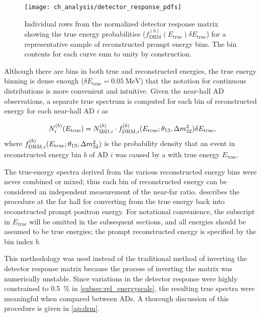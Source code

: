 \begin{figure}
    \centering
    \texttt{[image: ch\_analysis/detector\_response\_pdfs]}
    \caption[Individual rows of normalized detector response matrix]{
        Individual rows from the normalized detector response matrix
        showing the true \nuebar{} energy probabilities
        ($f^{(b)}_\text{DRM}(E_\text{true})\delta E_\text{true}$)
        for a representative sample of reconstructed prompt energy bins.
        The bin contents for each curve sum to unity by construction.
    }
    \label{fig:drm_pdfs}
\end{figure}

Although there are bins in both true and reconstructed energies,
the true energy binning is dense enough ($\delta E_{\text{true}} = \SI{0.05}{\MeV}$)
that the notation for continuous distributions is more convenient and intuitive.
Given the near-hall AD observations,
a separate true \nuebar{} spectrum is computed
for each bin of reconstructed energy for each near-hall AD $i$ as

\begin{equation}\label{eq:drm}
    N_i^{(b)}(E_{\text{true}}) = N_{\text{IBD},i}^{(b)}
    \cdot f_{\text{DRM},i}^{(b)}(E_{\text{true}}; \theta_{13}, \Delta m^2_{32}) \delta E_{\text{true}},
\end{equation}
where $f_{\text{DRM},i}^{(b)}(E_{\text{true}}; \theta_{13}, \Delta m^2_{32})$ is the probability density
that an event in reconstructed energy bin $b$
of AD $i$
was caused by a \nuebar{} with true energy $E_{\text{true}}$.

The true-energy spectra derived from the various reconstructed energy bins
were never combined or mixed;
thus each bin of reconstructed energy can be considered an independent measurement
of the near-far ratio.
 describes the procedure at the far hall
for converting from the true \nuebar{} energy back into reconstructed prompt positron energy.
For notational convenience, the subscript in $E_{\text{true}}$ will be omitted
in the subsequent sections,
and all energies should be assumed to be true \nuebar{} energies;
the prompt reconstructed energy is specified by the bin index $b$.

This methodology was used instead of the traditional method of
inverting the detector response matrix
because the process of inverting the matrix was numerically unstable.
Since variations in the detector response were highly constrained
to \SI{0.5}{\percent} in \cref{subsec:rel_energyscale},
the resulting true \nuebar{} spectra were meaningful when compared between ADs.
A thorough discussion of this procedure is given in \cref{ap:drm}.

